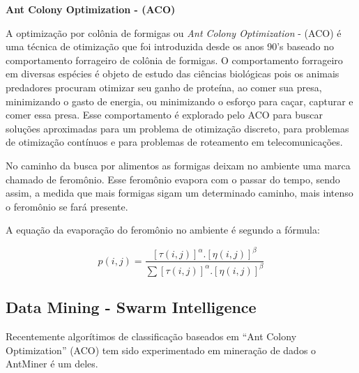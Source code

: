 \documentclass[conference,compsoc]{IEEEtran}
\begin{document}
\vspace{0.3cm}
\textbf{Ant Colony Optimization - (ACO)}
\vspace{0.1cm}

A optimização por colônia de formigas ou \textit{Ant Colony Optimization} - (ACO) é uma técnica de otimização que foi
introduzida desde os anos 90's \cite{Blum2005} baseado no comportamento forrageiro de colônia de formigas.
O comportamento forrageiro em diversas espécies \cite{Dorigo2005} é objeto de estudo das ciências biológicas pois os animais predadores 
procuram otimizar seu ganho de proteína, ao comer sua presa, minimizando o gasto de energia, ou minimizando o esforço para
caçar, capturar e comer essa presa. Esse comportamento é explorado pelo ACO para buscar soluções aproximadas para um
problema de otimização discreto, para problemas de otimização contínuos e para problemas de roteamento em telecomunicações.

No caminho da busca por alimentos as formigas deixam no ambiente uma marca chamado de feromônio.
Esse feromônio evapora com o passar do tempo, sendo assim, a medida que mais formigas sigam um determinado caminho,
mais intenso o feromônio se fará presente. 

A equação da evaporação do feromônio no ambiente é segundo a fórmula:

\begin{equation}
p(i,j)= \frac{[\tau (i,j)]^{\alpha }.[\eta (i,j)]^{\beta}}{\sum [\tau (i,j)]^{\alpha }.[\eta (i,j)]^{\beta}}
\end{equation}



\subsection{Data Mining - Swarm Intelligence}\label{arte:palavraChave:Swarm}

Recentemente algorítimos de classificação baseados em ``Ant Colony Optimization'' (ACO) tem sido experimentado em mineração de dados\cite{Baig2012} o AntMiner é um deles.
\end{document}
